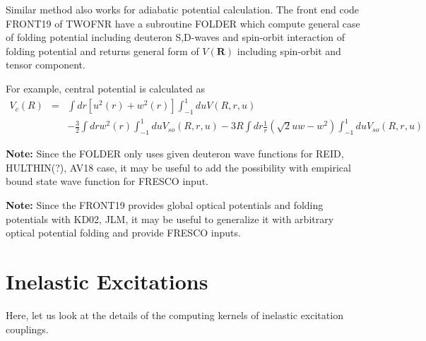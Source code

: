 \documentclass[11pt]{book}
\def\bm{\boldsymbol}
\def\vR{{\bm R}}
\newcommand{\bea}{\begin{eqnarray}}
\newcommand{\eea}{\end{eqnarray}}
\newcommand{\no}{\nonumber \\}
\begin{document}
Similar method also works for adiabatic potential calculation. 
The front end code FRONT19 of TWOFNR have a subroutine FOLDER 
which compute general case of folding potential including deuteron S,D-waves
and spin-orbit interaction of folding potential and returns general form
of $V(\vR)$ including spin-orbit and tensor component. 

For example, central potential is calculated as
\bea 
V_c(R)&=&\int dr [u^2(r)+w^2(r)]\int_{-1}^1 du V(R,r,u) \no 
     & & -\frac{3}{2} \int dr w^2(r)\int_{-1}^1 du V_{so}(R,r,u)
      -3R\int dr\frac{1}{r}(\sqrt{2}u w-w^2)\int_{-1}^1 du V_{so}(R,r,u)\nonumber  
\eea 

{\bf Note:} Since the FOLDER only uses given deuteron wave functions
for REID, HULTHIN(?), AV18 case, it may be useful to add the possibility
with empirical bound state wave function for FRESCO input.

{\bf Note:} Since the FRONT19 provides global optical potentials
and folding potentials with KD02, JLM, it may be useful to generalize it
with arbitrary optical potential folding and provide FRESCO inputs. 

\chapter{Inelastic Excitations}
Here, let us look at the details of the computing kernels of inelastic 
excitation couplings. 
\end{document}
